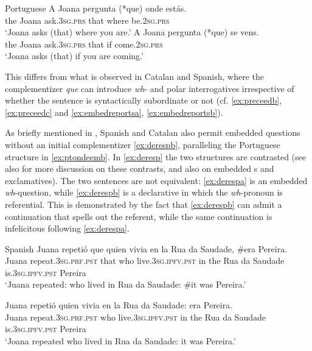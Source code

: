 \ea Portuguese 
\ea\label{ex:ptondeemb}
\gll A Joana  pergunta (*que) onde estás. \\
  the Joana ask.\textsc{3sg.prs} that where be.\textsc{2sg.prs}\\
  \glt `Joana asks (that) where you are.'
  \ex\label{ex:ptvensemb}
  \gll A Joana  pergunta (*que) se vens. \\
    the Joana ask.\textsc{3sg.prs} that if come.\textsc{2sg.prs}\\
  \glt `Joana asks (that) if you are coming.'
\z
\z

This differs from what is observed in Catalan and Spanish, where the complementizer \emph{que} can introduce \textit{wh}- and polar interrogatives irrespective of whether the sentence is syntactically subordinate or not (cf. \ref{ex:preceedb}, \ref{ex:preceedc} and \ref{ex:embedreportsa}, \ref{ex:embedreportsb}). 


As briefly mentioned in , Spanish and Catalan also permit embedded questions without an initial complementizer \eqref{ex:derespb}, paralleling the Portuguese structure in \eqref{ex:ptondeemb}. In \eqref{ex:deresp} the two structures are contrasted (see also \citealt{GonzalesPlanas2014} for more discussion on these contrasts, and also on embedded s and exclamatives). The two sentences are not equivalent:  \eqref{ex:derespa} is an embedded \textit{wh}-question, while \eqref{ex:derespb} is a declarative in which the \textit{wh}-pronoun  is referential. This is demonstrated by the fact that \eqref{ex:derespb}  can admit a continuation that spells out the referent, while the same continuation is infelicitous following \eqref{ex:derespa}. 

\ea\label{ex:deresp} Spanish
\ea\label{ex:derespa}
 \gll Juana repetió que quien vivia en la Rua da Saudade, \#era  Pereira. \\
Juana repeat.\textsc{3sg.prf.pst} that who live.\textsc{3sg.ipfv.pst} in the Rua da Saudade is.\textsc{3sg.ipfv.pst}  Pereira\\
\glt `Juana repeated: who lived in Rua da Saudade: \#it was Pereira.'
\ex \label{ex:derespb}

\gll
Juana repetió quien vivia en la Rua da Saudade: era Pereira. \\
Juana repeat.\textsc{3sg.prf.pst}  who live.\textsc{3sg.ipfv.pst} in the Rua da Saudade is.\textsc{3sg.ipfv.pst}  Pereira\\
\glt `Joana repeated who lived in Rua da Saudade: it was Pereira.'	
\z
\z

